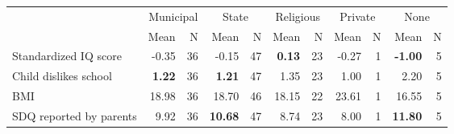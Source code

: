 \begin{tabular}{l r r r r r r r r r r}
\toprule
& \multicolumn{2}{c}{Municipal} & \multicolumn{2}{c}{State} & \multicolumn{2}{c}{Religious} & \multicolumn{2}{c}{Private} & \multicolumn{2}{c}{None} \\
& \scriptsize Mean & \scriptsize N & \scriptsize Mean & \scriptsize N & \scriptsize Mean & \scriptsize N & \scriptsize Mean & \scriptsize N & \scriptsize Mean & \scriptsize N \\
\midrule
Standardized IQ score &     -0.35 &        36 &     -0.15 &        47 & \textbf{     0.13} &        23 &     -0.27 &         1 & \textbf{    -1.00} &         5 \\
Child dislikes school & \textbf{     1.22} &        36 & \textbf{     1.21} &        47 &      1.35 &        23 &      1.00 &         1 &      2.20 &         5 \\
BMI &     18.98 &        36 &     18.70 &        46 &     18.15 &        22 &     23.61 &         1 &     16.55 &         5 \\
SDQ reported by parents &      9.92 &        36 & \textbf{    10.68} &        47 &      8.74 &        23 &      8.00 &         1 & \textbf{    11.80} &         5 \\
\bottomrule
\end{tabular}
